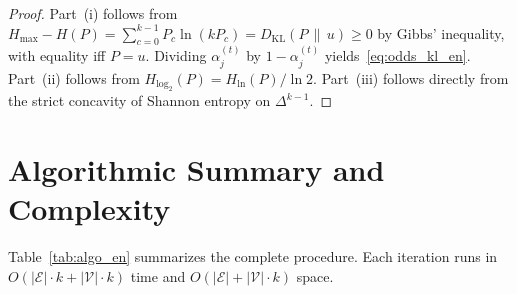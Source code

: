 \documentclass[11pt, a4paper]{article}
\theoremstyle{definition}
\theoremstyle{definition}
\begin{document}
\begin{proof}
Part~(i) follows from $H_{\max} - H(P) = \sum_{c=0}^{k-1} P_c \ln(k P_c) = D_{\mathrm{KL}}(P \,\|\, u) \ge 0$ by Gibbs' inequality, with equality iff $P = u$. Dividing $\alpha_j^{(t)}$ by $1 - \alpha_j^{(t)}$ yields~\eqref{eq:odds_kl_en}. Part~(ii) follows from $H_{\log_2}(P) = H_{\ln}(P)/\ln 2$. Part~(iii) follows directly from the strict concavity of Shannon entropy on $\Delta^{k-1}$.
\end{proof}

\section{Algorithmic Summary and Complexity}

Table~\ref{tab:algo_en} summarizes the complete procedure. Each iteration runs in $O(|\mathcal{E}|\cdot k + |\mathcal{V}|\cdot k)$ time and $O(|\mathcal{E}| + |\mathcal{V}|\cdot k)$ space.
\end{document}
